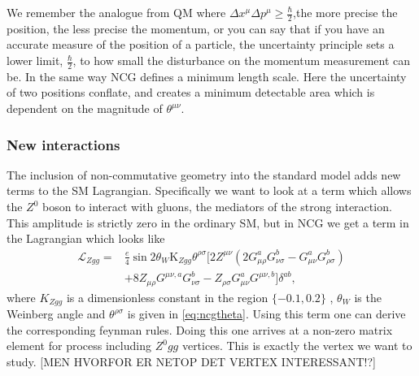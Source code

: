 We remember the analogue from QM where $\Delta x^{\mu} \Delta p^{\mu} \ge \frac{\hbar}{2}$,the more precise the position, the less precise the momentum, or you can say that if you have an accurate measure of the position of a particle, the uncertainty principle sets a lower limit, $\frac{\hbar}{2}$, to how small the disturbance on the momentum measurement can be. In the same way NCG defines a minimum length scale. Here the uncertainty of two positions conflate, and creates a minimum detectable area which is dependent on the magnitude of $\theta^{\mu \nu}$.

\subsubsection{New interactions}
The inclusion of non-commutative geometry into the standard model adds new terms to the SM Lagrangian. Specifically we want to look at a term which allows the $Z^0$ boson to interact with gluons, the mediators of the strong interaction. This amplitude is strictly zero in the ordinary SM, but in NCG we get a term in the Lagrangian which looks like \cite{melic2005smn}
\begin{align} \label{eq:zggterm}
	\mathcal{L}_{Zgg} = &\frac{e}{4}\sin{2\theta_W}\textrm{K}_{Zgg}\theta^{\rho\sigma}
	[2 Z^{\mu\nu} (2 G_{\mu\rho}^a G_{\nu\sigma}^b - G_{\mu\nu}^a G_{\rho\sigma}^b) \nonumber \\
	 &+ 8 Z_{\mu\rho} G^{\mu\nu,a} G_{\nu\sigma}^b - Z_{\rho\sigma} G_{\mu\nu}^a G^{\mu\nu,b}
	] \delta^{ab},
\end{align}
where $K_{Zgg}$ is a dimensionless constant in the region $\{-0.1,0.2\}$ \cite{behr2003dnc}, $\theta_W$ is the Weinberg angle and $\theta^{\rho\sigma}$ is given in \eqref{eq:ncgtheta}. Using this term one can derive the corresponding feynman rules. Doing this one arrives at a non-zero matrix element for process including $Z^0gg$ vertices. \cite{melic2005smn} This is exactly the vertex we want to study. [MEN HVORFOR ER NETOP DET VERTEX INTERESSANT!?]